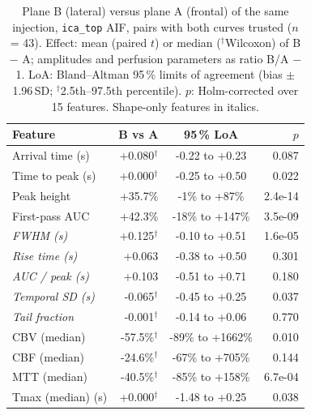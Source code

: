 \begin{table}[t]
\centering
\caption{Plane B (lateral) versus plane A (frontal) of the same injection, \texttt{ica\_top} AIF, pairs with both curves trusted ($n$ = 43). Effect: mean (paired $t$) or median ($^\dagger$Wilcoxon) of B $-$ A; amplitudes and perfusion parameters as ratio B/A $-$ 1. LoA: Bland--Altman 95\,\% limits of agreement (bias $\pm$ 1.96\,SD; $^\dagger$2.5th--97.5th percentile). $p$: Holm-corrected over 15 features. Shape-only features in italics.}
\label{tab:sq2_main}
\footnotesize
\begin{tabular}{lrcr}
\hline
Feature & B vs A & 95\,\% LoA & $p$ \\
\hline
Arrival time (s) & +0.080$^\dagger$ & -0.22 to +0.23 & 0.087 \\
Time to peak (s) & +0.000$^\dagger$ & -0.25 to +0.50 & 0.022 \\
Peak height & +35.7\% & -1\% to +87\% & 2.4e-14 \\
First-pass AUC & +42.3\% & -18\% to +147\% & 3.5e-09 \\
\emph{FWHM (s)} & +0.125$^\dagger$ & -0.10 to +0.51 & 1.6e-05 \\
\emph{Rise time (s)} & +0.063 & -0.38 to +0.50 & 0.301 \\
\emph{AUC / peak (s)} & +0.103 & -0.51 to +0.71 & 0.180 \\
\emph{Temporal SD (s)} & -0.065$^\dagger$ & -0.45 to +0.25 & 0.037 \\
\emph{Tail fraction} & -0.001$^\dagger$ & -0.14 to +0.06 & 0.770 \\
CBV (median) & -57.5\%$^\dagger$ & -89\% to +1662\% & 0.010 \\
CBF (median) & -24.6\%$^\dagger$ & -67\% to +705\% & 0.144 \\
MTT (median) & -40.5\%$^\dagger$ & -85\% to +158\% & 6.7e-04 \\
Tmax (median) (s) & +0.000$^\dagger$ & -1.48 to +0.25 & 0.038 \\
\hline
\end{tabular}
\end{table}
